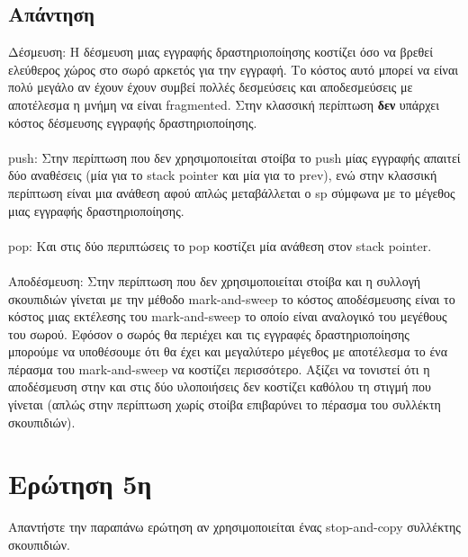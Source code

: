 \documentclass[a4paper]{article}
\begin{document}
\subsection*{Απάντηση}
Δέσμευση: Η δέσμευση μιας εγγραφής δραστηριοποίησης κοστίζει όσο να βρεθεί ελεύθερος χώρος στο σωρό αρκετός για την εγγραφή. Το κόστος αυτό μπορεί να είναι πολύ μεγάλο αν έχουν έχουν συμβεί πολλές δεσμεύσεις και αποδεσμεύσεις με αποτέλεσμα η μνήμη να είναι \foreignlanguage{english}{fragmented}. Στην κλασσική περίπτωση \textbf{δεν} υπάρχει κόστος δέσμευσης εγγραφής δραστηριοποίησης. \\\\
\foreignlanguage{english}{push}: Στην περίπτωση που δεν χρησιμοποιείται στοίβα το \foreignlanguage{english}{push} μίας εγγραφής απαιτεί δύο αναθέσεις (μία για το \foreignlanguage{english}{stack pointer} και μία για το \foreignlanguage{english}{prev}), ενώ στην κλασσική περίπτωση είναι μια ανάθεση αφού απλώς μεταβάλλεται ο \foreignlanguage{english}{sp} σύμφωνα με το μέγεθος μιας εγγραφής δραστηριοποίησης. \\\\
\foreignlanguage{english}{pop}: Και στις δύο περιπτώσεις το \foreignlanguage{english}{pop} κοστίζει μία ανάθεση στον \foreignlanguage{english}{stack pointer}. \\\\
Αποδέσμευση: Στην περίπτωση που δεν χρησιμοποιείται στοίβα και η συλλογή σκουπιδιών γίνεται με την μέθοδο \foreignlanguage{english}{mark-and-sweep} το κόστος αποδέσμευσης είναι το κόστος μιας εκτέλεσης του \foreignlanguage{english}{mark-and-sweep} το οποίο είναι αναλογικό του μεγέθους του σωρού. Εφόσον ο σωρός θα περιέχει και τις εγγραφές δραστηριοποίησης μπορούμε να υποθέσουμε ότι θα έχει και μεγαλύτερο μέγεθος με αποτέλεσμα το ένα πέρασμα του \foreignlanguage{english}{mark-and-sweep} να κοστίζει περισσότερο. Αξίζει να τονιστεί ότι η αποδέσμευση στην και στις δύο υλοποιήσεις δεν κοστίζει καθόλου τη στιγμή που γίνεται (απλώς στην περίπτωση χωρίς στοίβα επιβαρύνει το πέρασμα του συλλέκτη σκουπιδιών).

\section*{Ερώτηση 5η}
Απαντήστε την παραπάνω ερώτηση αν χρησιμοποιείται ένας \foreignlanguage{english}{stop-and-copy} συλλέκτης σκουπιδιών.
\end{document}
